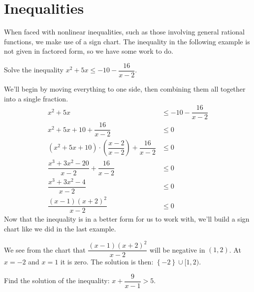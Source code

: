 \documentclass{ximera}
\begin{document}
\section{Inequalities}
When faced with nonlinear inequalities, such as those involving general rational functions, we make use of a sign chart.
The inequality in the following example is not given in factored form, so we have some work to do.
\begin{example}
	Solve the inequality $\displaystyle x^2 + 5x \leq -10 -\dfrac{16}{x-2}$.
	\begin{explanation}
		We'll begin by moving everything to one side, then combining them all together into a single fraction.
		\begin{align*}
			x^2 + 5x &\leq -10 -\dfrac{16}{x-2}\\
			x^2 + 5x +10 +\dfrac{16}{x-2} &\leq 0\\
			\left(x^2+5x+10\right) \cdot \left(\dfrac{x-2}{x-2}\right) +\dfrac{16}{x-2} &\leq 0\\
			\dfrac{x^3+3x^2-20}{x-2} + \dfrac{16}{x-2} &\leq 0\\
			\dfrac{x^3+3x^2-4}{x-2} &\leq 0\\
			\dfrac{(x-1)(x+2)^2}{x-2} &\leq 0
		\end{align*}
		Now that the inequality is in a better form for us to work with, we'll build a sign chart like we did in the last example.


		We see from the chart that $\displaystyle \dfrac{(x-1)(x+2)^2}{x-2}$ will be negative in $(1,2)$.  At $x=-2$ and $x=1$ it is zero.
		The solution is then: $\left\{ -2\right\} \cup [ 1, 2 )$.
	\end{explanation}
\end{example}


\begin{problem}
	Find the solution of the inequality: $\displaystyle x + \dfrac{9}{x-1} > 5$.
	\begin{multipleChoice}
		\choice{$[-1,\infty)$}
		\choice{$\{-1\} \cup [2,\infty)$}
	\end{multipleChoice}
\end{problem}
\end{document}
